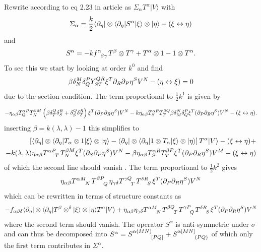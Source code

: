 \documentclass{article}
\begin{document}
\newpage 
Rewrite according to eq 2.23 in article as $\Sigma_\alpha T^\alpha|V\rangle$ with
\begin{align}
    \Sigma_\alpha = \frac{k}{2}\langle\partial_\eta|\otimes \langle\partial_\eta|S^\alpha|\xi\rangle\otimes|\eta\rangle-(\xi\leftrightarrow\eta)
\end{align}
and 
\begin{align}
    S^\alpha = -kf\indices{^\alpha_{\beta\gamma}}T^\beta\otimes T^\gamma+T^\alpha\otimes 1-1\otimes T^\alpha. 
\end{align}
To see this we start by looking at order $k^0$ and find 
\begin{align}
    \beta\delta^M_N\delta^P_QY^{QR}_{ST}\xi^T\partial_R\partial_P\eta^SV^N-(\eta\leftrightarrow\xi) = 0 
\end{align}
due to the section condition. The term proportional to $\frac{1}{2}k^1$ is given by 

\begin{align}
    -\eta_{\alpha\beta}T^{\alpha P}_QT^{\beta M}_N\left(\beta\delta_T^Q\delta_S^R+\delta_S^Q\delta_T^R\right)\xi^T(\partial_P\partial_R\eta^S)V^N-k\eta_{\alpha\beta}T^{\alpha R}_S T^{\beta Q}_T\beta\delta_M^N\delta^P_Q\xi^T(\partial_P\partial_R\eta^S)V^N-(\xi\leftrightarrow\eta).
\end{align}
inserting $\beta=k(\lambda,\lambda)-1$ this simplifies to 
\begin{align}
    \left[\langle\pd_\eta|\otimes\langle \pd_\eta|T_\alpha\otimes 1|\xi\rangle\otimes |\eta\rangle-\langle\pd_\eta|\otimes\langle \pd_\eta|1\otimes T_\alpha|\xi\rangle\otimes |\eta\rangle\right]T^\alpha |V\rangle-(\xi\leftrightarrow\eta)+\\
    -k(\lambda,\lambda)\eta_{\alpha\beta}T\indices{^{\alpha P}_T} T^{\beta M}_N\xi^T(\pd_S\pd_P\eta^S)V^N-\beta\eta_{\alpha\beta}T^{\alpha R}_{S}T^{\beta P}_T\xi^T(\pd_P\pd_R\eta^S)V^M-(\xi\leftrightarrow\eta)
\end{align}
of which the second line should vanish . The term proportional to $\frac{1}{2}k^2$ gives
\begin{align}
    \eta_{\alpha\beta}T\indices{^{\alpha M}_N}T\indices{^{\beta P}_Q}\eta_{\gamma\delta}T\indices{^{\gamma Q}_T}T\indices{^{\delta R}_S}\xi^T(\pd_P\pd_R\eta^S)V^N
\end{align}
which can be rewritten in terms of structure constants as 
\begin{align}
    -f_{\alpha\beta\delta}\langle \pd_\eta|\otimes \langle \pd_\eta |T^\beta \otimes ^\delta |\xi\rangle\otimes|\eta\rangle T^\alpha |V\rangle+\eta_{\alpha\beta}\eta_{\gamma\delta}T\indices{^{\alpha M}_N}T\indices{^{\beta Q}_T}T\indices{^{\gamma P}_Q}T\indices{^{\delta R}_S}\xi^T(\pd_P\pd_R\eta^S)V^N
\end{align}
where the second term should vanish.
The operator $S^\alpha$ is anti-symmetric under $\sigma$ and can thus be decomposed into $S^\alpha = S\indices{^{\alpha(MN)}_{[PQ]}}+S\indices{^{\alpha[MN]}_{(PQ)}}$ of which only the first term contributes in $\Sigma^\alpha$. 
\end{document}

